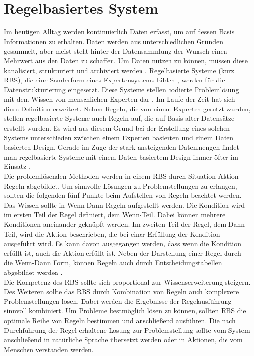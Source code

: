 \section{Regelbasiertes System}
Im heutigen Alltag werden kontinuierlich Daten erfasst, um auf dessen Basis Informationen zu erhalten. Daten werden aus unterschiedlichen Gründen gesammelt, aber meist steht hinter der Datensammlung der Wunsch einen Mehrwert aus den Daten zu schaffen. Um Daten nutzen zu können, müssen diese kanalisiert, strukturiert und archiviert werden \cite{managermagazin:datensammlung}. Regelbasierte Systeme (kurz RBS), die eine Sonderform eines Expertensystems bilden \cite{ieee:ruleBasedSystemAndNetworks}, werden für die Datenstrukturierung eingesetzt. Diese Systeme stellen codierte Problemlösung mit dem Wissen von menschlichen Experten dar \cite{Hayes-Roth:1985:RS:4284.4286}. Im Laufe der Zeit hat sich diese Definition erweitert. Neben Regeln, die von einem Experten gesetzt wurden, stellen regelbasierte Systeme auch Regeln auf, die auf Basis alter Datensätze erstellt wurden. Es wird aus diesem Grund bei der Erstellung eines solchen Systems unterschieden zwischen einem Experten basierten und einem Daten basierten Design. Gerade im Zuge der stark ansteigenden Datenmengen findet man regelbasierte Systeme mit einem Daten basiertem Design immer öfter im Einsatz \cite{ieee:ruleBasedSystemAndNetworks}.\\
Die problemlösenden Methoden werden in einem RBS durch Situation-Aktion Regeln abgebildet. Um sinnvolle Lösungen zu Problemstellungen zu erlangen, sollten die folgenden fünf Punkte beim Aufstellen von Regeln beachtet werden.\\
Das Wissen sollte in Wenn-Dann-Regeln aufgestellt werden. Die Kondition wird im ersten Teil der Regel definiert, dem Wenn-Teil. Dabei können mehrere Konditionen aneinander geknüpft werden. Im zweiten Teil der Regel, dem Dann-Teil, wird die Aktion beschrieben, die bei einer Erfüllung der Kondition ausgeführt wird. Es kann davon ausgegangen werden, dass wenn die Kondition erfüllt ist, auch die Aktion erfüllt ist. Neben der Darstellung einer Regel durch die Wenn-Dann Form, können Regeln auch durch Entscheidungstabellen abgebildet werden \cite{HSAugsburg:RuleEngine}.\\
Die Kompetenz des RBS sollte sich proportional zur Wissenserweiterung steigern. Des Weiteren sollte das RBS durch Kombination von Regeln auch komplexere Problemstellungen lösen. Dabei werden die Ergebnisse der Regelausführung sinnvoll kombiniert. Um Probleme bestmöglich lösen zu können, sollten RBS die optimale Reihe von Regeln bestimmen und anschließend ausführen. Die nach Durchführung der Regel erhaltene Lösung zur Problemstellung sollte vom System anschließend in natürliche Sprache übersetzt werden oder in Aktionen, die vom Menschen verstanden werden.\\
